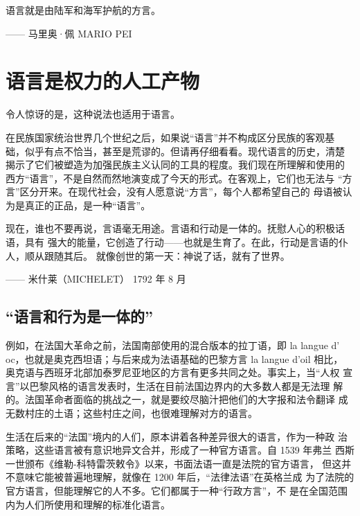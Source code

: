 \begin{tcolorbox}
语言就是由陆军和海军护航的方言。  
\begin{flushright}
—— 马里奥·佩 MARIO PEI 
\end{flushright}
\end{tcolorbox}


\section{语言是权力的人工产物}

令人惊讶的是，这种说法也适用于语言。

在民族国家统治世界几个世纪之后，如果说“语言”并不构成区分民族的客观基 础，似乎有点不恰当，甚至是荒谬的。但请再仔细看看。现代语言的历史，清楚 揭示了它们被塑造为加强民族主义认同的工具的程度。我们现在所理解和使用的 西方“语言”，不是自然而然地演变成了今天的形式。在客观上，它们也无法与 “方言”区分开来。在现代社会，没有人愿意说“方言”，每个人都希望自己的 母语被认为是真正的正品，是一种“语言”。


\begin{tcolorbox}
现在，谁也不要再说，言语毫无用途。言语和行动是一体的。抚慰人心的积极话语，具有 强大的能量，它创造了行动——也就是生育了。在此，行动是言语的仆人，顺从跟随其后。
 就像创世的第一天：神说了话，就有了世界。
\begin{flushright}
—— 米什莱（MICHELET） 1792 年 8 月
\end{flushright}
\end{tcolorbox}

\subsection{“语言和行为是一体的”}

例如，在法国大革命之前，法国南部使用的混合版本的拉丁语，即 la langue d’ oc，也就是奥克西坦语；与后来成为法语基础的巴黎方言 la langue d’oil 相比， 奥克语与西班牙北部加泰罗尼亚地区的方言有更多共同之处。事实上，当“人权 宣言”以巴黎风格的语言发表时，生活在目前法国边界内的大多数人都是无法理 解的。法国革命者面临的挑战之一，就是要绞尽脑汁把他们的大字报和法令翻译 成无数村庄的土语；这些村庄之间，也很难理解对方的语言。

生活在后来的“法国”境内的人们，原本讲着各种差异很大的语言，作为一种政 治策略，这些语言被有意识地异文合并，形成了一种官方语言。自 1539 年弗兰  西斯一世颁布《维勒-科特雷茨敕令》以来，书面法语一直是法院的官方语言， 但这并不意味它能被普遍地理解，就像在 1200 年后，“法律法语”在英格兰成 为了法院的官方语言，但能理解它的人不多。它们都属于一种“行政方言”，不 是在全国范围内为人们所使用和理解的标准化语言。

